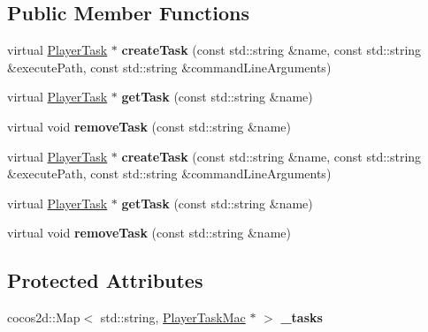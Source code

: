 \subsection*{Public Member Functions}
\begin{DoxyCompactItemize}
\item 
\mbox{\label{classPlayerTaskServiceMac_a14c6721eab21796f84291d07260a9275}} 
virtual \hyperlink{classPlayerTask}{Player\+Task} $\ast$ {\bfseries create\+Task} (const std\+::string \&name, const std\+::string \&execute\+Path, const std\+::string \&command\+Line\+Arguments)
\item 
\mbox{\label{classPlayerTaskServiceMac_aec624a4d26dcaa265ac9533219889d3e}} 
virtual \hyperlink{classPlayerTask}{Player\+Task} $\ast$ {\bfseries get\+Task} (const std\+::string \&name)
\item 
\mbox{\label{classPlayerTaskServiceMac_a4ff3c8c18a117a5be312a9c15b1cf07d}} 
virtual void {\bfseries remove\+Task} (const std\+::string \&name)
\item 
\mbox{\label{classPlayerTaskServiceMac_a068e9832cb5c8e3d619371bae14cd8a1}} 
virtual \hyperlink{classPlayerTask}{Player\+Task} $\ast$ {\bfseries create\+Task} (const std\+::string \&name, const std\+::string \&execute\+Path, const std\+::string \&command\+Line\+Arguments)
\item 
\mbox{\label{classPlayerTaskServiceMac_a77432de067c68b4dfae544b268384feb}} 
virtual \hyperlink{classPlayerTask}{Player\+Task} $\ast$ {\bfseries get\+Task} (const std\+::string \&name)
\item 
\mbox{\label{classPlayerTaskServiceMac_aba68e45c3a22ed47dc501c4237cceda9}} 
virtual void {\bfseries remove\+Task} (const std\+::string \&name)
\end{DoxyCompactItemize}
\subsection*{Protected Attributes}
\begin{DoxyCompactItemize}
\item 
\mbox{\label{classPlayerTaskServiceMac_a608c89cb7d94f88b2b6a7861a07a1b07}} 
cocos2d\+::\+Map$<$ std\+::string, \hyperlink{classPlayerTaskMac}{Player\+Task\+Mac} $\ast$ $>$ {\bfseries \+\_\+tasks}
\end{DoxyCompactItemize}


